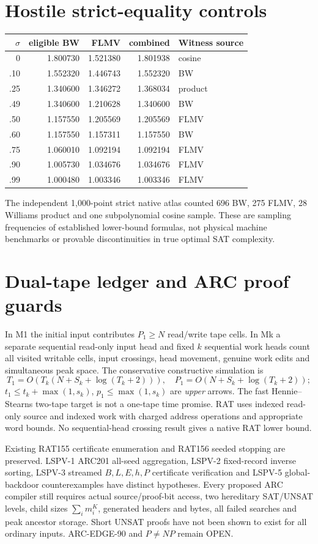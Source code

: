 \documentclass[11pt]{article}
\begin{document}
\section{Hostile strict-equality controls}
\begin{center}\begin{tabular}{@{}rrrrl@{}}\toprule
$\sigma$&eligible BW&FLMV&combined&Witness source\\\midrule
0&1.800730&1.521380&1.801938&cosine\\
.10&1.552320&1.446743&1.552320&BW\\
.25&1.340600&1.346272&1.368034&product\\
.49&1.340600&1.210628&1.340600&BW\\
.50&1.157550&1.205569&1.205569&FLMV\\
.60&1.157550&1.157311&1.157550&BW\\
.75&1.060010&1.092194&1.092194&FLMV\\
.90&1.005730&1.034676&1.034676&FLMV\\
.99&1.000480&1.003346&1.003346&FLMV\\\bottomrule
\end{tabular}\end{center}
The independent 1,000-point strict native atlas counted 696 BW,
275 FLMV, 28 Williams product and one subpolynomial cosine sample.
These are sampling frequencies of established lower-bound formulas,
not physical machine benchmarks or provable discontinuities in
true optimal SAT complexity.
\section{Dual-tape ledger and ARC proof guards}
In M1 the initial input contributes $P_1\ge N$ read/write
tape cells. In Mk a separate sequential read-only input head
and fixed $k$ sequential work heads count all visited writable
cells, input crossings, head movement, genuine work edits and
simultaneous peak space. The conservative constructive simulation
is
\[
T_1=O(T_k(N+S_k+\log(T_k+2))),\quad
P_1=O(N+S_k+\log(T_k+2));
\]
$t_1\le t_k+\max(1,s_k)$,
$p_1\le\max(1,s_k)$ are \emph{upper} arrows.
The fast Hennie--Stearns two-tape target is not a one-tape
time promise. RAT uses indexed read-only source and indexed
work with charged address operations and appropriate word bounds.
No sequential-head crossing result gives a native RAT lower bound.

Existing RAT155 certificate enumeration and RAT156 seeded
stopping are preserved. LSPV-1 ARC201 all-seed aggregation,
LSPV-2 fixed-record inverse sorting, LSPV-3 streamed
$B,L,E,h,P$ certificate verification and LSPV-5 global-backdoor
counterexamples have distinct hypotheses. Every proposed
ARC compiler still requires actual source/proof-bit access,
two hereditary SAT/UNSAT levels, child sizes
$\sum_i m_i^K$, generated headers and bytes, all failed
searches and peak ancestor storage. Short UNSAT proofs have
not been shown to exist for all ordinary inputs.
ARC-EDGE-90 and $P\ne NP$ remain OPEN.
\end{document}
